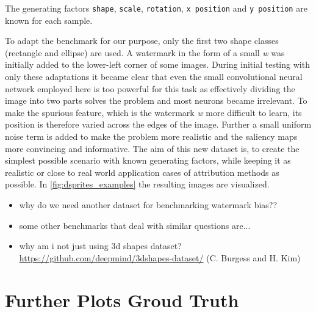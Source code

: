 The generating factors \verb|shape|, \verb|scale|, \verb|rotation|, \verb|x position| and \verb|y position| are known for each sample.

To adapt the benchmark for our purpose, only the first two shape classes (rectangle and ellipse) are used. A watermark in the form of a small \textit{w} was initially added to the lower-left corner of some images. During initial testing with only these adaptations it became clear that even the small convolutional neural network employed here is too powerful for this task as effectively dividing the image into two parts solves the problem and most neurons became irrelevant.
To make the spurious feature, which is the watermark \textit{w} more difficult to learn, its position is therefore varied across the edges of the image. Further a small uniform noise term is added to make the problem more realistic and the saliency maps more convincing and informative.
The aim of this new dataset is, to create the simplest possible scenario with known generating factors, while keeping it as realistic or close to real world application cases of attribution methods as possible. In \autoref{fig:dsprites_examples} the resulting images are visualized.



\begin{itemize}
    \item why do we need another dataset for benchmarking watermark bias??
    \item some other benchmarks that deal with similar questions are...
    \item why am i not just using 3d shapes dataset? \url{https://github.com/deepmind/3dshapes-dataset/} (C. Burgess and H. Kim)
\end{itemize}

\section{Further Plots Groud Truth}
